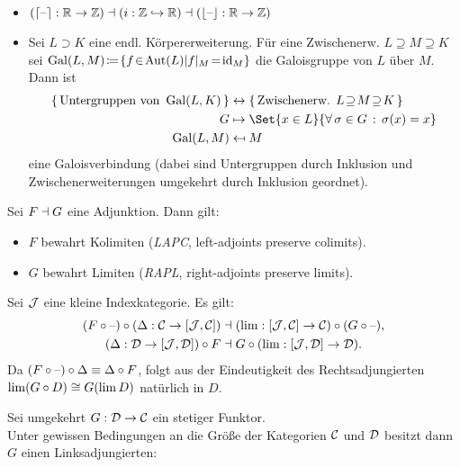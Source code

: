 \documentclass{cheat-sheet}
\DeclareMathOperator{\Gal}{Gal} %
\newcommand{\ceil}[1]{\lceil #1 \rceil} %
\newcommand{\floor}[1]{\lfloor #1 \rfloor} %
\begin{document}
\begin{bspe}
  \begin{itemize}
    \item $(\ceil{\blank} : \R \to \Z) \ladj (i : \Z \hookrightarrow \R) \ladj (\floor{\blank} : \R \to \Z)$
    \item Sei $L \supset K$ eine endl. Körpererweiterung.
    Für eine Zwischenerw. $L \!\supseteq\! M \!\supseteq\! K$ sei
    $\Gal(L, M) \!\coloneqq\! \{ f \!\in\! \Aut(L) | f|_M \!=\! \id_M \}$ die Galoisgruppe von $L$ über $M$.
    Dann ist
    \begin{align*}
      \{ \, \text{Untergruppen von } \Gal(L, K) \, \} & \leftrightarrow \{ \, \text{Zwischenerw. } L \!\supseteq\! M \!\supseteq\! K \, \} \\
      G & \mapsto \Set{x \in L}{\fa{\sigma \in G} \sigma(x) = x} \\
      \Gal(L, M) & \mapsfrom M
    \end{align*}
    eine Galoisverbindung (dabei sind Untergruppen durch Inklusion und Zwischenerweiterungen umgekehrt durch Inklusion geordnet).
  \end{itemize}
\end{bspe}

\begin{lem}
  Sei $F \dashv G$ eine Adjunktion. Dann gilt:
  \begin{itemize}
    \item $F$ bewahrt Kolimiten (\emph{LAPC}, left-adjoints preserve colimits).
    \item $G$ bewahrt Limiten (\emph{RAPL}, right-adjoints preserve limits).
  \end{itemize}
\end{lem}

\begin{beweis}[RAPL]
  Sei $\mathcal{J}$ eine kleine Indexkategorie.
  Es gilt:
  \begin{align*}
    (F \circ \text{--}) \circ (\Delta : \mathcal{C} \to [\mathcal{J}, \mathcal{C}]) & \dashv (\lim : [\mathcal{J}, \mathcal{C}] \to \mathcal{C}) \circ (G \circ \text{--}), \\
    (\Delta : \mathcal{D} \to [\mathcal{J}, \mathcal{D}]) \circ F & \dashv G \circ (\lim : [\mathcal{J}, \mathcal{D}] \to \mathcal{D}).
  \end{align*}
  Da $(F \circ \text{--}) \circ \Delta \equiv \Delta \circ F$, folgt aus der Eindeutigkeit des Rechtsadjungierten
  $\lim (G \circ D) \cong G(\lim D)$ natürlich in $D$.
\end{beweis}

\begin{bem}
  Sei umgekehrt $G : \mathcal{D} \to \mathcal{C}$ ein stetiger Funktor. \\
  Unter gewissen Bedingungen an die Größe der Kategorien $\mathcal{C}$ und $\mathcal{D}$ besitzt dann $G$ einen Linksadjungierten:
\end{bem}
\end{document}
